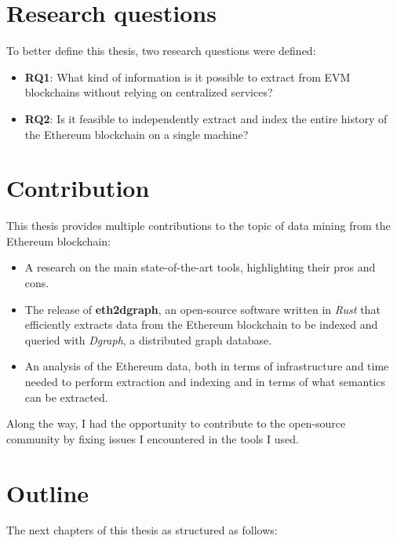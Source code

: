 \section{Research questions}

To better define this thesis, two research questions were defined:

\begin{itemize}
    \item \textbf{RQ1}: What kind of information is it possible to extract from EVM blockchains without relying on centralized services?
    \item \textbf{RQ2}: Is it feasible to independently extract and index the entire history of the Ethereum blockchain on a single machine?
\end{itemize} 

\section{Contribution}

This thesis provides multiple contributions to the topic of data mining from the Ethereum blockchain:

\begin{itemize}
    \item A research on the main state-of-the-art tools, highlighting their pros and cons.
    \item The release of \textbf{eth2dgraph}, an open-source software written in \textit{Rust} that efficiently extracts data from the Ethereum blockchain to be indexed and queried with \textit{Dgraph}, a distributed graph database. 
    \item An analysis of the Ethereum data, both in terms of infrastructure and time needed to perform extraction and indexing and in terms of what semantics can be extracted.
\end{itemize}

Along the way, I had the opportunity to contribute to the open-source community by fixing issues I encountered in the tools I used.

\section{Outline}

The next chapters of this thesis as structured as follows:

